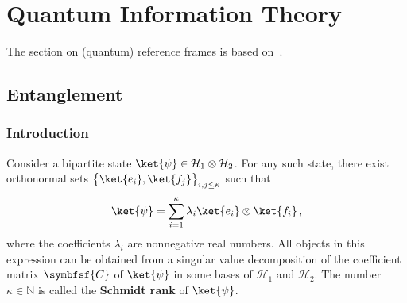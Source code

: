 \chapter{Quantum Information Theory}\label{chapter:quantum_computing}

    The section on (quantum) reference frames is based on~\cite{de_la_hamette_quantum_2020}.

    \minitoc

\section{Entanglement}
\subsection{Introduction}

    \begin{construct}
        Consider a bipartite state $\ket{\psi}\in\mathcal{H}_1\otimes\mathcal{H}_2$. For any such state, there exist orthonormal sets $\bigl\{\ket{e_i},\ket{f_j}\bigr\}_{i,j\leq\kappa}$ such that
        \begin{gather}
            \ket{\psi} = \sum_{i=1}^\kappa\lambda_i\ket{e_i}\otimes\ket{f_i}\,,
        \end{gather}
        where the coefficients $\lambda_i$ are nonnegative real numbers. All objects in this expression can be obtained from a singular value decomposition of the coefficient matrix $\symbfsf{C}$ of $\ket{\psi}$ in some bases of $\mathcal{H}_1$ and $\mathcal{H}_2$. The number $\kappa\in\mathbb{N}$ is called the \textbf{Schmidt rank} of $\ket{\psi}$.
    \end{construct}



